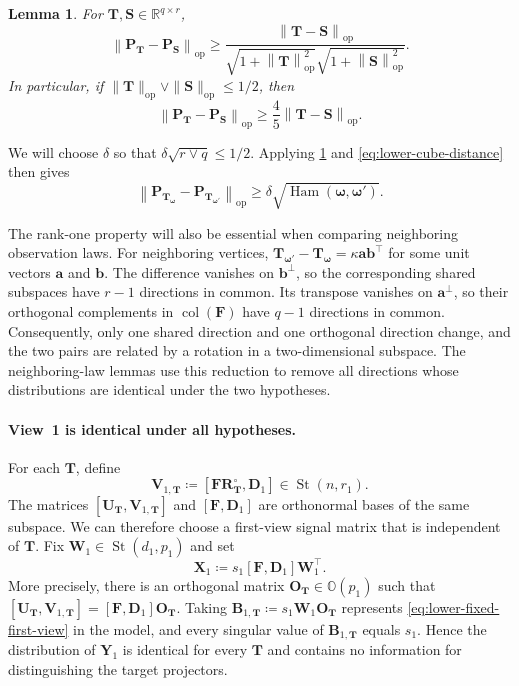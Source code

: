 \documentclass[11pt]{article}
\newtheorem{lemma}{Lemma}
\newcommand{\trans}{\top}
\newcommand{\opn}[1]{\left\lVert #1\right\rVert_{\mathrm{op}}}
\begin{document}
\begin{lemma}
\label{lem:lower-projector-separation}
For $\bm T,\bm S\in\mathbb R^{q\times r}$,
\[
  \opn{\bm P_{\bm T}-\bm P_{\bm S}}
  \ge
  \frac{
    \opn{\bm T-\bm S}
  }{
    \sqrt{1+\opn{\bm T}^2}
    \sqrt{1+\opn{\bm S}^2}
  }.
\]
In particular, if
$\|\bm T\|_{\mathrm{op}}\vee\|\bm S\|_{\mathrm{op}}\le1/2$, then
\[
  \opn{\bm P_{\bm T}-\bm P_{\bm S}}
  \ge
  \frac45\opn{\bm T-\bm S}.
\]
\end{lemma}



We will choose $\delta$ so that
$\delta\sqrt{r\vee q}\le1/2$.  Applying
\cref{lem:lower-projector-separation} and
\cref{eq:lower-cube-distance} then gives
\begin{equation}
\label{eq:lower-target-separation}
  \opn{
    \bm P_{\bm T_{\bm\omega}}
    -
    \bm P_{\bm T_{\bm\omega'}}
  }
  \ge
  \delta
  \sqrt{\operatorname{Ham}(\bm\omega,\bm\omega')}.
\end{equation}

The rank-one property will also be essential when comparing neighboring
observation laws.  For neighboring vertices,
$\bm T_{\bm\omega'}-\bm T_{\bm\omega}
=\kappa\bm a\bm b^\trans$ for some unit vectors $\bm a$ and $\bm b$.
The difference vanishes on $\bm b^\perp$, so the corresponding shared
subspaces have $r-1$ directions in common.  Its transpose vanishes on
$\bm a^\perp$, so their orthogonal complements in
$\operatorname{col}(\bm F)$ have $q-1$ directions in common.
Consequently, only one shared direction and one orthogonal direction change,
and the two pairs are related by a rotation in a two-dimensional subspace.
The neighboring-law lemmas use this reduction to remove all directions whose
distributions are identical under the two hypotheses.


\paragraph{View~1 is identical under all hypotheses.}
For each $\bm T$, define
\begin{equation}
\label{eq:lower-view-one-frames}
  \bm V_{1,\bm T}
  \coloneqq
  [\bm F\bm R_{\bm T}^{\circ},\bm D_1]
  \in\operatorname{St}(n,r_1).
\end{equation}
The matrices $[\bm U_{\bm T},\bm V_{1,\bm T}]$ and
$[\bm F,\bm D_1]$ are orthonormal bases of the same subspace.  We can
therefore choose a first-view signal matrix that is independent of $\bm T$.
Fix $\bm W_1\in\operatorname{St}(d_1,p_1)$ and set
\begin{equation}
\label{eq:lower-fixed-first-view}
  \bm X_1
  \coloneqq
  s_1[\bm F,\bm D_1]\bm W_1^\trans.
\end{equation}
More precisely, there is an orthogonal matrix
$\bm O_{\bm T}\in\mathbb O(p_1)$ such that
$[\bm U_{\bm T},\bm V_{1,\bm T}]
=[\bm F,\bm D_1]\bm O_{\bm T}$.  Taking
$\bm B_{1,\bm T}\coloneqq s_1\bm W_1\bm O_{\bm T}$ represents
\cref{eq:lower-fixed-first-view} in the model, and every singular value of
$\bm B_{1,\bm T}$ equals $s_1$.  Hence the distribution of $\bm Y_1$ is
identical for every $\bm T$ and contains no information for distinguishing
the target projectors.
\end{document}
